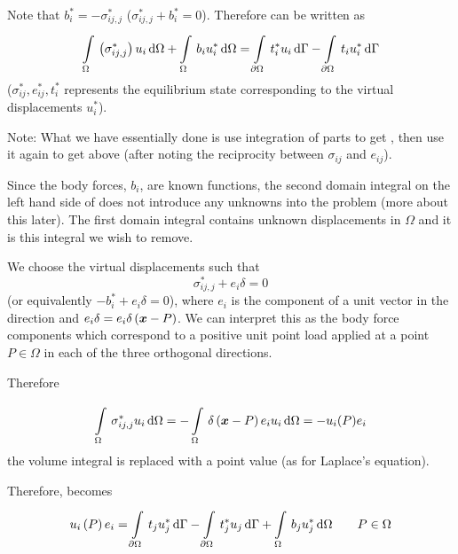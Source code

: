 Note that $b_{i}^{*} = -\sigma_{ij,j} ^{*}$  (\ie $\sigma_{ij,j} ^{*} +
b_{i}^{*} =  0$). Therefore  can be written as
\begin{equation}
  \goneint{\pbrac{\sigma_{ij,j} ^{*}} u_{i}}{\Omega} + 
  \goneint{b_{i} u_{i}^{*}}{\Omega} = 
  \gint{\del \Omega}{}{t_{i}^{*} u_{i}}{\Gamma} - 
  \gint{\del \Omega}{}{t_{i} u_{i}^{*}}{\Gamma}
  \label{eqn:eqnD}
\end{equation}
($\sigma_{ij} ^{*},e_{ij}^{*},t_{i}^{*}$ represents the equilibrium state
corresponding to the virtual displacements $u_{i}^{*}$).

Note: What we have essentially done is use integration of parts to get
, then use it again to get  above (after
noting the reciprocity between $\sigma_{ij}$ and $e_{ij}$).

Since the body forces, $b_{i}$, are known functions, the second domain
integral on the left hand side of  does not introduce any
unknowns into the problem (more about this later). The first domain integral
contains unknown displacements in $\Omega$ and it is this integral we wish to
remove.
 
We choose the virtual displacements such that
\begin{equation}
  \sigma_{ij,j}^{*} + e_{i} \delta = 0 
  \label{eqn:FundSol}
\end{equation}
(or equivalently $- b_{i}^{*} + e_{i} \delta = 0$), where $e_{i}$ is the 
component of a unit vector in the  direction and $e_{i}\delta =
e_{i} \delta\left(  \boldsymbol{x}  - P \right) $. We can interpret this as the body force
components which correspond to a positive unit point load applied at a point
$P \in \Omega$ in each of the three orthogonal directions.

Therefore

\begin{displaymath}
  \gint{\Omega}{}{\sigma_{ij,j}^{*} u_{i}}{\Omega} = -
  \gint{\Omega}{}{\fnof{\delta}{\vectr{x} - P} e_{i} u_{i}}{\Omega} = - u_{i}(P)e_{i}
\end{displaymath}
\ie the volume integral is replaced with a point value (as for Laplace's 
equation).

Therefore,  becomes
\begin{equation}
  \fnof{u_{i}}{P}e_{i}  = \gint{\del \Omega}{}{t_{j} u_{j}^{*}}{\Gamma}  -  
  \gint{\del \Omega}{}{t_{j}^{*} u_{j}}{\Gamma} + 
  \goneint{b_{j} u_{j}^{*}}{\Omega} \qquad P \in \Omega
  \label{eqn:eqnE}
\end{equation}

